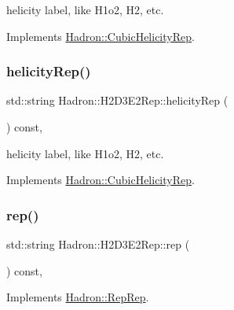 helicity label, like H1o2, H2, etc. 

Implements \mbox{\hyperlink{structHadron_1_1CubicHelicityRep_af1096946b7470edf0a55451cc662f231}{Hadron\+::\+Cubic\+Helicity\+Rep}}.

\mbox{\label{structHadron_1_1H2D3E2Rep_af42edde155e8d26e4f67fa592d7023d0}} 
\subsubsection{\texorpdfstring{helicityRep()}{helicityRep()}\hspace{0.1cm}{\footnotesize\ttfamily [2/2]}}
{\footnotesize\ttfamily std\+::string Hadron\+::\+H2\+D3\+E2\+Rep\+::helicity\+Rep (\begin{DoxyParamCaption}{ }\end{DoxyParamCaption}) const\hspace{0.3cm}{\ttfamily [inline]}, {\ttfamily [virtual]}}

helicity label, like H1o2, H2, etc. 

Implements \mbox{\hyperlink{structHadron_1_1CubicHelicityRep_af1096946b7470edf0a55451cc662f231}{Hadron\+::\+Cubic\+Helicity\+Rep}}.

\mbox{\label{structHadron_1_1H2D3E2Rep_a1e87b376344ff9529dd7f69395f739fa}} 
\subsubsection{\texorpdfstring{rep()}{rep()}\hspace{0.1cm}{\footnotesize\ttfamily [1/3]}}
{\footnotesize\ttfamily std\+::string Hadron\+::\+H2\+D3\+E2\+Rep\+::rep (\begin{DoxyParamCaption}{ }\end{DoxyParamCaption}) const\hspace{0.3cm}{\ttfamily [inline]}, {\ttfamily [virtual]}}



Implements \mbox{\hyperlink{structHadron_1_1RepRep_ab3213025f6de249f7095892109575fde}{Hadron\+::\+Rep\+Rep}}.

\mbox{\label{structHadron_1_1H2D3E2Rep_a1e87b376344ff9529dd7f69395f739fa}} 
